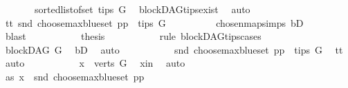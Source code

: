 \begin{isabellebody}
\ \ \ \ \ \ \ {\isacharparenleft}{\kern0pt}sorted{\isacharunderscore}{\kern0pt}list{\isacharunderscore}{\kern0pt}of{\isacharunderscore}{\kern0pt}set\ {\isacharparenleft}{\kern0pt}tips\ G{\isacharparenright}{\kern0pt}{\isacharparenright}{\kern0pt}{\isacharparenright}{\kern0pt}{\isachardoublequoteclose}\ \isamarkupfalse%
\ blockDAG{\isachardot}{\kern0pt}tips{\isacharunderscore}{\kern0pt}exist\ \isamarkupfalse%
\ auto\isanewline
\ \ \ \ \ \ \isamarkupfalse%
\ \isamarkupfalse%
\ tt{}{\isacharcolon}{\kern0pt}\ {\isachardoublequoteopen}snd\ {\isacharparenleft}{\kern0pt}choose{\isacharunderscore}{\kern0pt}max{\isacharunderscore}{\kern0pt}blue{\isacharunderscore}{\kern0pt}set\ pp{\isacharparenright}{\kern0pt}\ {\isasymin}\ tips\ G{\isachardoublequoteclose}\isanewline
\ \ \ \ \ \ \ \ \isamarkupfalse%
\ chosen{\isacharunderscore}{\kern0pt}map{\isacharunderscore}{\kern0pt}simps\ bD\isanewline
\ \ \ \ \ \ \ \ \isamarkupfalse%
\ blast\ \ \ \isanewline
\ \ \ \ \ \ \isamarkupfalse%
\ {\isacharquery}{\kern0pt}thesis\ \isanewline
\ \ \ \ \ \ \ \ \ \isamarkupfalse%
{\isacharparenleft}{\kern0pt}rule\ blockDAG{\isachardot}{\kern0pt}tips{\isacharunderscore}{\kern0pt}cases{\isacharparenright}{\kern0pt}\isanewline
\ \ \ \ \ \ \ \ \ \isamarkupfalse%
\ {\isachardoublequoteopen}blockDAG\ G{\isachardoublequoteclose}\ \isamarkupfalse%
\ bD\ \isamarkupfalse%
\ auto\isanewline
\ \ \ \ \ \ \ \ \ \isamarkupfalse%
\ {\isachardoublequoteopen}snd\ {\isacharparenleft}{\kern0pt}choose{\isacharunderscore}{\kern0pt}max{\isacharunderscore}{\kern0pt}blue{\isacharunderscore}{\kern0pt}set\ pp{\isacharparenright}{\kern0pt}\ {\isasymin}\ tips\ G{\isachardoublequoteclose}\ \isamarkupfalse%
\ tt{}\ \isamarkupfalse%
\ auto\isanewline
\ \ \ \ \ \ \ \ \ \isamarkupfalse%
\ {\isachardoublequoteopen}x\ {\isasymin}\ verts\ G{\isachardoublequoteclose}\ \isamarkupfalse%
\ x{\isacharunderscore}{\kern0pt}in\ \isamarkupfalse%
\ auto\isanewline
\ \ \ \ \ \ \ \isamarkupfalse%
\ \ \isanewline
\ \ \ \ \ \ \ \ \isamarkupfalse%
\ as{}{\isacharcolon}{\kern0pt}\ {\isachardoublequoteopen}x\ {\isacharequal}{\kern0pt}\ snd\ {\isacharparenleft}{\kern0pt}choose{\isacharunderscore}{\kern0pt}max{\isacharunderscore}{\kern0pt}blue{\isacharunderscore}{\kern0pt}set\ pp{\isacharparenright}{\kern0pt}{\isachardoublequoteclose}\isanewline

\end{isabellebody}
